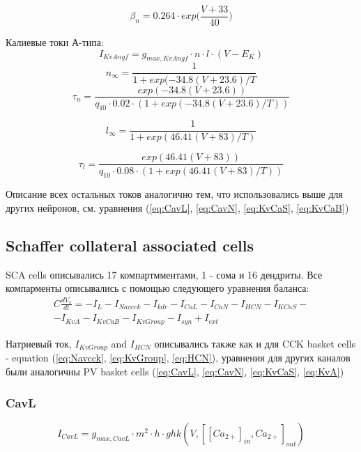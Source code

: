 \documentclass[12pt]{article}
\begin{document}
\begin{equation}
\beta_n = 0.264 \cdot exp \Big( \frac{V + 33}{40} \Big)
\end{equation}

Калиевые токи А-типа:
\begin{equation}
I_{KvAngf} = g_{max, KvAngf} \cdot n \cdot l \cdot (V - E_K)
\end{equation}
\begin{equation}
n_{\infty} = \frac{1}{1 + exp(-34.8(V + 23.6)/T}
\end{equation}
\begin{equation}
\tau_n = \frac{exp(-34.8(V + 23.6)) }
{q_{10} \cdot 0.02 \cdot (1 + exp(-34.8(V + 23.6)/T))}
\end{equation}

\begin{equation}
l_{\infty} = \frac{1}{1 + exp(46.41(V + 83)/T)}
\end{equation}

\begin{equation}
\tau_l = \frac{exp(46.41(V + 83)) }
{q_{10} \cdot 0.08 \cdot (1 + exp(46.41(V + 83)/T))}
\end{equation}

Описание всех остальных токов аналогично тем, что использовались выше для других нейронов, см. уравнения (\ref{eq:CavL}, \ref{eq:CavN}, \ref{eq:KvCaS}, \ref{eq:KvCaB})

\subsection{Schaffer collateral associated cells}
SCA cells описывались 17 компартмментами, 1 - сома и 16 дендриты. Все компарменты описывались с помощью следующего уравнения баланса:
\begin{eqnarray}
C\frac{dV_s}{dt}=-I_L-I_{Navcck}-I_{kdr}-I_{CaL}-I_{CaN}-I_{HCN}-I_{KCaS}- \nonumber \\ -I_{KvA}-I_{KvCaB}-I_{KvGroup}-I_{syn} + I_{ext}
\end{eqnarray}

Натриевый ток, $I_{KvGroup}$ and $I_{HCN}$ описывались также как и для CCK basket cells - equation  (\ref{eq:Navcck}, \ref{eq:KvGroup}, \ref{eq:HCN}), уравнения для других каналов были аналогичны PV basket cells  (\ref{eq:CavL}, \ref{eq:CavN}, \ref{eq:KvCaS}, \ref{eq:KvA})




\subsubsection{CavL}
\begin{equation}
I_{CavL} = g_{max, CavL} \cdot m^2 \cdot h \cdot ghk(V, [[Ca_{2+}]_{in}, Ca_{2+}]_{out} )
\end{equation}
\end{document}
